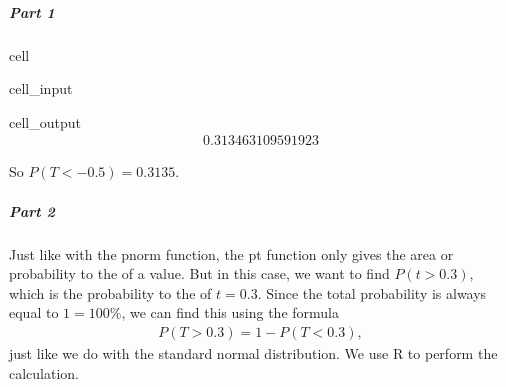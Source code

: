\documentclass[letterpaper,10pt,english]{jupyterBook}
\begin{document}
\subparagraph{Part 1}
\label{\detokenize{Ch5 Confidence Intervals/5.3 Student's t-Distribution:part-1}}
\begin{sphinxuseclass}{cell}\begin{sphinxVerbatimInput}

\begin{sphinxuseclass}{cell_input}
\begin{sphinxVerbatim}[commandchars=\\\{\}]
\end{sphinxVerbatim}

\end{sphinxuseclass}\end{sphinxVerbatimInput}
\begin{sphinxVerbatimOutput}

\begin{sphinxuseclass}{cell_output}\begin{equation*}
\begin{split}0.313463109591923\end{split}
\end{equation*}
\end{sphinxuseclass}\end{sphinxVerbatimOutput}

\end{sphinxuseclass}
\sphinxAtStartPar
So \(P(T < -0.5) = 0.3135\).


\subparagraph{Part 2}
\label{\detokenize{Ch5 Confidence Intervals/5.3 Student's t-Distribution:part-2}}
\sphinxAtStartPar
Just like with the pnorm function, the pt function only gives the area or probability to the  of a value. But in this case, we want to find \(P(t > 0.3)\), which is the probability to the  of \(t = 0.3\). Since the total probability is always equal to \(1 = 100\%\), we can find this using the formula
\begin{equation*}
\begin{split} P(T > 0.3) = 1 - P(T < 0.3), \end{split}
\end{equation*}
\sphinxAtStartPar
just like we do with the standard normal distribution. We use R to perform the calculation.
\end{document}
